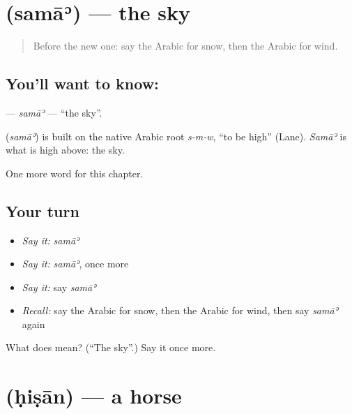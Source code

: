 \section[\texorpdfstring{\ar{سماء} (samāʾ)}{سماء (samāʾ)}]{ (samāʾ) — the sky}

\label{lesson:AR-C78-sama}



\begin{quote}
Before the new one: say the Arabic for snow, then the Arabic for wind.
\end{quote}

\subsection*{You'll want to know: }
\textbf{} — \emph{samāʾ} — \textquotedblleft{}the sky\textquotedblright{}.

\begin{cousinweb}
\textbf{} (\emph{samāʾ}) is built on the native Arabic root \emph{s-m-w}, \textquotedblleft{}to be high\textquotedblright{} (Lane). \emph{Samāʾ} is what is high above: the sky.
\end{cousinweb}

\begin{grammarlens}[title={What you've built}]
One more word for this chapter.
\end{grammarlens}

\subsection*{Your turn}
\begin{itemize}
\raggedright
  \item \emph{Say it:} \emph{samāʾ}
  \item \emph{Say it:} \emph{samāʾ}, once more
  \item \emph{Say it:} say \emph{samāʾ}
  \item \emph{Recall:} say the Arabic for snow, then the Arabic for wind, then say \emph{samāʾ} again
\end{itemize}

\begin{tcolorbox}[breakable,colback=teal!4,colframe=teal!35!black,title={Before you move on}]
What does  mean? (\textquotedblleft{}The sky\textquotedblright{}.) Say it once more.
\end{tcolorbox}
\section[\texorpdfstring{\ar{حصان} (ḥiṣān)}{حصان (ḥiṣān)}]{ (ḥiṣān) — a horse}


